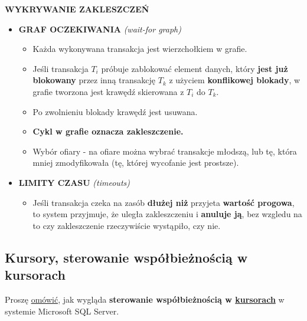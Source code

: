 \textbf{WYKRYWANIE ZAKLESZCZEŃ}
\begin{itemize}
    \item \textbf{GRAF OCZEKIWANIA} \textit{(wait-for graph)}
    \begin{itemize}
        \item Każda wykonywana transakcja jest wierzchołkiem w grafie.
        \item Jeśli transakcja $T_i$ próbuje zablokować element danych,
        który \textbf{jest już blokowany} przez inną transakcję $T_k$
        z użyciem \textbf{konflikowej blokady}, w grafie tworzona
        jest krawędź skierowana z $T_i$ do $T_k$.
        \item Po zwolnieniu blokady krawędź jest usuwana.
        \item \textbf{Cykl w grafie oznacza zakleszczenie.}
        \item Wybór ofiary - na ofiare można wybrać transakcje młodszą, lub
        tę, która mniej zmodyfikowała (tę, której wycofanie jest
        prostsze).
    \end{itemize}

    \item \textbf{LIMITY CZASU} \textit{(timeouts)}
    \begin{itemize}
        \item Jeśli transakcja czeka na zasób \textbf{dłużej niż}
        przyjeta \textbf{wartość progowa}, to system przyjmuje, że
        uległa zakleszczeniu i \textbf{anuluje ją}, bez wzgledu na to
        czy zakleszczenie rzeczywiście wystąpiło, czy nie.
    \end{itemize}
\end{itemize}

\pagebreak

\subsection{Kursory, sterowanie współbieżnością w kursorach} %
\label{sub:kursory_sterowanie_wspolbieznoscia_w_kursorach}

\horrule{0.5pt}
Proszę \underline{omówić}, jak wygląda \textbf{sterowanie współbieżnością w
\underline{kursorach}} w systemie Microsoft SQL Server.\\
\horrule{0.5pt}


